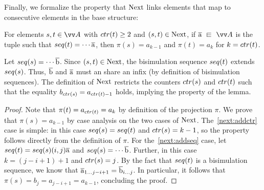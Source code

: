 Finally, we formalize the property that $\mathrm{Next}$ links elements that map to consecutive elements in the base structure:
\begin{lemma}\label{lem:projection-next}
For elements $s, t \in \unraveldom{A}$ with $\ctr{t} \ge 2$ and $(s,t) \in \mathrm{Next}$, if $\elemtuplea \sqin \unraveldom{A}$ is the tuple such that $\seq{t} = \cdots \elemtuplea$, then $\pi(s) = a_{k-1}$ and $\pi(t) = a_{k}$ for $k = \ctr{t}$.
\end{lemma}
\begin{proofsketch}
  Let $\seq{s} = \cdots \elemtupleb$.
  Since $(s,t) \in \mathrm{Next}$, the bisimulation sequence $\seq{t}$ extends $\seq{s}$.
  Thus, $\overline{\mathrm{b}}$ and $\overline{\mathrm{a}}$ must an share an infix (by definition of bisimulation sequences).
  The definition of $\mathrm{Next}$ restricts the counters $\ctr{s}$ and $\ctr{t}$ such that the equality $b_{\ctr{s}} = a_{\ctr{t}-1}$ holds, implying the property of the lemma.
\end{proofsketch}
\begin{proof}
  Note that $\pi(t) = a_{\ctr{t}} = a_{k}$ by definition of the projection $\pi$.
  We prove that $\pi(s) = a_{k-1}$ by case analysis on the two cases of $\mathrm{Next}$.
  The~\ref{next:addctr} case is simple: in this case $\seq{s} = \seq{t}$ and $\ctr{s} = k - 1$, so the property follows directly from the definition of $\pi$.
  For the~\ref{next:addseq} case, let $\seq{t} = \seq{s} (i,j) \elemtuplea$ and $\seq{s} = \cdots \elemtupleb$.
  Further, in this case $k = (j - i + 1) + 1$ and $\ctr{s} = j$.
  By the fact that $\seq{t}$ is a bisimulation sequence, we know that $\overline{\mathrm{a}}_{1\ldots j-i+1} = \overline{\mathrm{b}}_{i\ldots j}$.
  In particular, it follows that $\pi(s) = b_{j} = a_{j-i+1} = a_{k-1}$, concluding the proof.
\end{proof}

